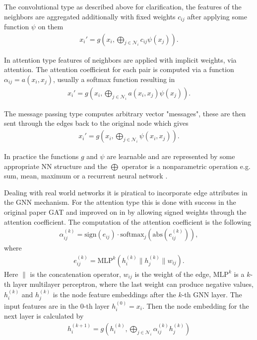 The convolutional type \cite[Chapter~5]{gnn_overview} as described above for
clarification, the features of the neighbors are aggregated additionally with
fixed weights $c_{ij}$ after applying some function $\psi$ on them
\begin{align}
    x_i' = g\left( x_i, \bigoplus_{j\in \mathcal{N}_i} c_{ij} \psi(x_j) \right).
\end{align}

In attention type \cite{gan_velickovic} features of neighbors are applied
with implicit weights, via attention. The attention coefficient for each
pair is computed via a function $\alpha_{ij} = a(x_i, x_j)$, usually a
softmax function resulting in
\begin{align}
    x_i' = g\left( x_i, \bigoplus_{j\in \mathcal{N}_i} a(x_i, x_j) \psi(x_j) \right).
\end{align}

The message passing type \cite[Chapter~5]{gnn_overview} computes arbitrary
vector "messages", these are then sent through the edges back to the
original node which gives
\begin{align}
    x_i' = g\left( x_i, \bigoplus_{j\in \mathcal{N}_i} \psi(x_i, x_j) \right).
\end{align}

In practice the functions $g$ and $\psi$ are learnable and are represented by
some appropriate NN structure and the $\bigoplus$ operator is a nonparametric
operation e.g. sum, mean, maximum or a recurrent neural network
\cite[Chapter~5]{gnn_overview}.
\newline

Dealing with real world networks it is piratical to incorporate edge
attributes in the GNN mechanism. For the attention type this is done with
success in the original paper GAT \cite{gan_velickovic} and improved on in
\cite{wsgat} by allowing signed weights through the attention coefficient.
The computation of the attention coefficient is the following
\begin{align}
    \alpha_{ij}^{(k)} = \text{sign}\left(e_{ij}  \right) \cdot
    \text{softmax}_j\left(\text{abs}(e_{ij}^{(k)})\right),
\end{align}
where
\begin{align}
    e_{ij}^{(k)} = \text{MLP}^{k}\left(h_i^{(k)} \| h_j^{(k)} \| w_{ij}\right).
\end{align}
Here $\|$ is the concatenation operator,  $w_{ij}$ is the weight
of the edge, $\text{MLP}^{k}$ is a $k$-th layer multilayer perceptron, where
the last weight can produce negative values, $h_i^{(k)}$ and $h_j^{(k)}$ is
the node feature embeddings after the $k$-th GNN layer. The input features
are in the 0-th layer $h_i^{(0)} = x_i$. Then the node embedding for the next
layer is calculated by
\begin{align}
    h_{i}^{(k+1)} = g\left( h_i^{(k)},
    \bigoplus_{j\in\mathcal{N}_i}\alpha_{ij}^{(k)}h_j^{(k)} \right)
\end{align}
